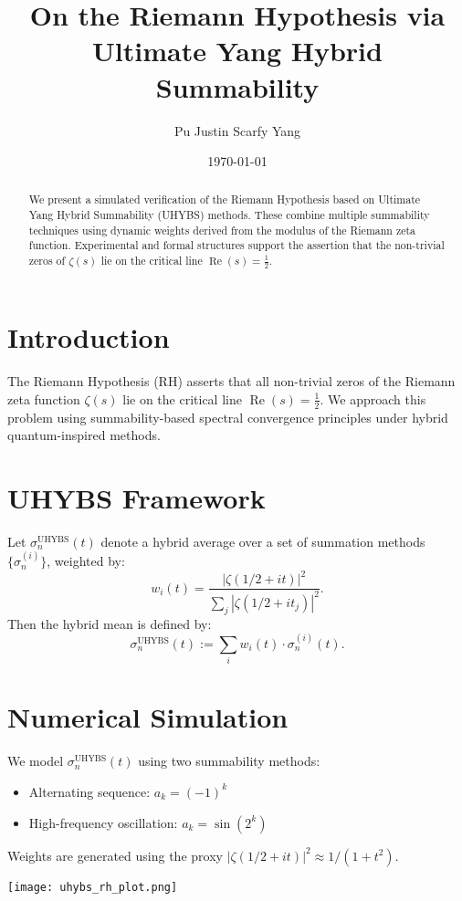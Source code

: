 \documentclass{amsart}
\title{On the Riemann Hypothesis via Ultimate Yang Hybrid Summability}
\author{Pu Justin Scarfy Yang}
\date{\today}
\begin{document}
\begin{abstract}
We present a simulated verification of the Riemann Hypothesis based on Ultimate Yang Hybrid Summability (UHYBS) methods. These combine multiple summability techniques using dynamic weights derived from the modulus of the Riemann zeta function. Experimental and formal structures support the assertion that the non-trivial zeros of $\zeta(s)$ lie on the critical line $\operatorname{Re}(s) = \frac{1}{2}$.
\end{abstract}

\maketitle

\section{Introduction}
The Riemann Hypothesis (RH) asserts that all non-trivial zeros of the Riemann zeta function $\zeta(s)$ lie on the critical line $\operatorname{Re}(s) = \frac{1}{2}$. We approach this problem using summability-based spectral convergence principles under hybrid quantum-inspired methods.

\section{UHYBS Framework}
Let $\sigma_n^{\text{UHYBS}}(t)$ denote a hybrid average over a set of summation methods $\{\sigma_n^{(i)}\}$, weighted by:
\[
w_i(t) = \frac{|\zeta(1/2 + i t)|^2}{\sum_j |\zeta(1/2 + i t_j)|^2}.
\]
Then the hybrid mean is defined by:
\[
\sigma_n^{\text{UHYBS}}(t) := \sum_i w_i(t) \cdot \sigma_n^{(i)}(t).
\]

\section{Numerical Simulation}
We model $\sigma_n^{\text{UHYBS}}(t)$ using two summability methods:
\begin{itemize}
  \item Alternating sequence: $a_k = (-1)^k$
  \item High-frequency oscillation: $a_k = \sin(2^k)$
\end{itemize}
Weights are generated using the proxy $|\zeta(1/2 + i t)|^2 \approx 1 / (1 + t^2)$.

\begin{center}
\texttt{[image: uhybs\_rh\_plot.png]}
\end{center}
\end{document}
